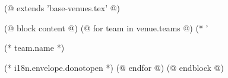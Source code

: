 (@ extends 'base-venues.tex' @)

(@ block content @)
    (@ for team in venue.teams @)
        \fontsize{120}{0}\selectfont(* '%

        \fontsize{30}{0}\selectfont(* team.name *)

        (* i18n.envelope.donotopen *)
        \newpage
    (@ endfor @)
(@ endblock @)
